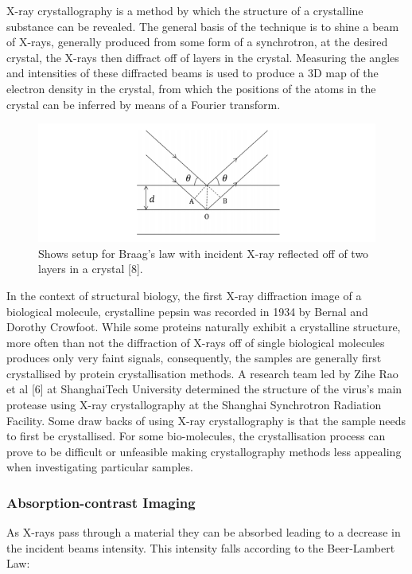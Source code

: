 \documentclass[11pt]{report}
\begin{document}
X-ray crystallography is a method by which the structure of a crystalline substance can be revealed. The general basis of the technique is to shine a beam of X-rays, generally produced from some form of a synchrotron, at the desired crystal, the X-rays then diffract off of layers in the crystal. Measuring the angles and intensities of these diffracted beams is used to produce a 3D map of the electron density in the crystal, from which the positions of the atoms in the crystal can be inferred by means of a Fourier transform. 
\begin{figure}[h!]
\centering
\includegraphics[scale=0.8]{Braag's Law.jpg}
\caption{Shows setup for Braag's law with incident X-ray reflected off of two layers in a crystal \cite{braagslaw}[8].}
\label{2}
\end{figure}

In the context of structural biology, the first X-ray diffraction image of a biological molecule, crystalline pepsin was recorded in 1934 by Bernal and Dorothy Crowfoot. While some proteins naturally exhibit a crystalline structure, more often than not the diffraction of X-rays off of single biological molecules produces only very faint signals, consequently, the samples are generally first crystallised by protein crystallisation methods. A research team led by Zihe Rao et al \cite{virusstructure}[6] at ShanghaiTech University determined the structure of the virus’s main protease using X-ray crystallography at the Shanghai Synchrotron Radiation Facility. Some draw backs of using X-ray crystallography is that the sample needs to first be crystallised. For some bio-molecules, the crystallisation process can prove to be difficult or unfeasible making crystallography methods less appealing when investigating particular samples. 

\subsubsection{Absorption-contrast Imaging}

As X-rays pass through a material they can be absorbed leading to a decrease in the incident beams intensity. This intensity falls according to the Beer-Lambert Law:
\end{document}
